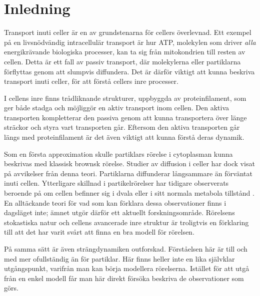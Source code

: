\chapter{Inledning}



Transport inuti celler är en av grundstenarna för cellers överlevnad. Ett exempel på en livsnödvändig intracellulär transport är hur ATP, molekylen som driver \emph{alla} energikrävande biologiska processer, kan ta sig från mitokondrien till resten av cellen. Detta är ett fall av passiv transport, där molekylerna eller partiklarna förflyttas genom att slumpvis diffundera. Det är därför viktigt att kunna beskriva transport inuti celler, för att förstå cellers inre processer.

I cellens inre finns trådliknande strukturer, uppbyggda av proteinfilament, som ger både stadga och möjliggör en aktiv transport inom cellen. Den aktiva transporten kompletterar den passiva genom att kunna transportera över länge sträckor och styra vart transporten går. Eftersom den aktiva transporten går längs med proteinfilament är det även viktigt att kunna förstå deras dynamik.


Som en första approximation skulle partiklars rörelse i cytoplasman kunna beskrivas med klassisk brownsk rörelse. Studier av diffusion i celler \cite{Hofling&Franosch2013,Dix_Crowdingeffects2008,Gou_etal2014,Parry_etal2014} har dock visat på avvikelser från denna teori. Partiklarna diffunderar långsammare än förväntat inuti cellen. Ytterligare skillnad i partikelrörelser har tidigare observerats beroende på om cellen befinner sig i dvala eller i sitt normala metabola tillstånd \cite{Parry_etal2014,Midtveldt_etal2016}. En alltäckande teori för vad som kan förklara dessa observationer finns i dagsläget inte; ämnet utgör därför ett aktuellt forskningsområde. Rörelsens stokastiska natur och cellens avancerade inre struktur är troligtvis en förklaring till att det har varit svårt att finna en bra modell för rörelsen. 

På samma sätt är även strängdynamiken outforskad. Förståelsen här är till och med mer ofullständig än för partiklar\cite{Koster_etal2005,Koster_etal2007,Koster_etal2008}. Här finns heller inte en lika självklar utgångspunkt, varifrån man kan börja modellera rörelserna. Istället för att utgå från en enkel modell får man här direkt försöka beskriva de observationer som görs.


